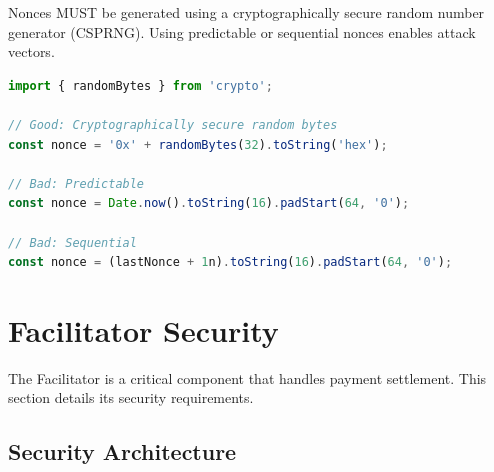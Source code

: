 \begin{securitybox}
Nonces MUST be generated using a cryptographically secure random number generator (CSPRNG). Using predictable or sequential nonces enables attack vectors.
\end{securitybox}

\begin{lstlisting}[language=typescript,caption={Secure nonce generation}]
import { randomBytes } from 'crypto';

// Good: Cryptographically secure random bytes
const nonce = '0x' + randomBytes(32).toString('hex');

// Bad: Predictable
const nonce = Date.now().toString(16).padStart(64, '0');

// Bad: Sequential
const nonce = (lastNonce + 1n).toString(16).padStart(64, '0');
\end{lstlisting}

\section{Facilitator Security}
\label{sec:security-facilitator}

The Facilitator is a critical component that handles payment settlement. This section details its security requirements.

\subsection{Security Architecture}

